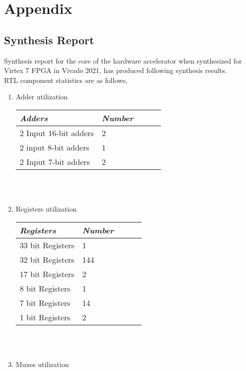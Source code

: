 \documentclass[12pt]{article}
\begin{document}
\section{Appendix} 
\subsection{Synthesis Report}
Synthesis report for the core of the hardware accelerator when synthesized for Virtex 7 FPGA in Vivado 2021, has produced following synthesis results. \\
RTL component statistics are as follows,
\begin{enumerate}
\item Adder utilization


\begin{tabular}{ *5l }    \toprule
\emph{Adders} & \emph{Number} &&& \\\midrule
2 Input 16-bit adders    & 2  \\ 
2 input 8-bit adders  	 & 1  \\
2 Input 7-bit adders   	 & 2  \\
\end{tabular}\\\\


\item Registers utilization

\begin{tabular}{ *5l }    \toprule
\emph{Registers} & \emph{Number}  \\\midrule
33 bit Registers & 1  \\ 
32 bit Registers & 144 \\
17 bit Registers & 2  \\
8  bit Registers & 1 \\
7  bit Registers & 14\\
1  bit Registers & 2\\
\end{tabular}\\\\


\item Muxes utilization



\end{enumerate}
\end{document}
